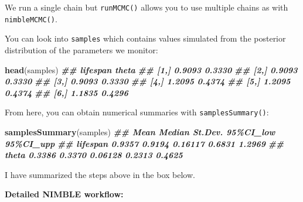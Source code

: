 \documentclass[
  12pt,
]{krantz}
\newenvironment{Shaded}{\begin{snugshade}}{\end{snugshade}}
\newcommand{\DocumentationTok}[1]{\textcolor[rgb]{0.56,0.35,0.01}{\textbf{\textit{#1}}}}
\newcommand{\FunctionTok}[1]{\textcolor[rgb]{0.13,0.29,0.53}{\textbf{#1}}}
\newcommand{\NormalTok}[1]{#1}
\begin{document}
We run a single chain but \texttt{runMCMC()} allows you to use multiple chains as with \texttt{nimbleMCMC()}.

You can look into \texttt{samples} which contains values simulated from the posterior distribution of the parameters we monitor:

\begin{Shaded}
\begin{Highlighting}[]
\FunctionTok{head}\NormalTok{(samples)}
\DocumentationTok{\#\#      lifespan  theta}
\DocumentationTok{\#\# [1,]   0.9093 0.3330}
\DocumentationTok{\#\# [2,]   0.9093 0.3330}
\DocumentationTok{\#\# [3,]   0.9093 0.3330}
\DocumentationTok{\#\# [4,]   1.2095 0.4374}
\DocumentationTok{\#\# [5,]   1.2095 0.4374}
\DocumentationTok{\#\# [6,]   1.1835 0.4296}
\end{Highlighting}
\end{Shaded}

From here, you can obtain numerical summaries with \texttt{samplesSummary()}:

\begin{Shaded}
\begin{Highlighting}[]
\FunctionTok{samplesSummary}\NormalTok{(samples)}
\DocumentationTok{\#\#            Mean Median St.Dev. 95\%CI\_low 95\%CI\_upp}
\DocumentationTok{\#\# lifespan 0.9357 0.9194 0.16117    0.6831    1.2969}
\DocumentationTok{\#\# theta    0.3386 0.3370 0.06128    0.2313    0.4625}
\end{Highlighting}
\end{Shaded}

I have summarized the steps above in the box below.

\textbf{Detailed NIMBLE workflow:}
\end{document}
